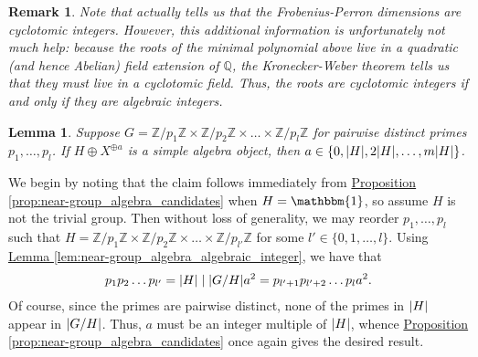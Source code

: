 \documentclass[12pt, reqno]{amsart}
\numberwithin{equation}{section}
\theoremstyle{plainspace}
\newtheorem{lemma}[theorem]{Lemma}
\theoremstyle{definitionspace}
\theoremstyle{remarkspace}
\newtheorem{remark}[theorem]{Remark}
\renewenvironment{proof}{{\noindent\textbf{Proof.}}}{\null\hfill\qedsymbol}
\DeclarePairedDelimiter{\abs}{\lvert}{\rvert}
\begin{document}
\begin{remark}\label{rem:near-group_cyclotomic_integer}
Note that \cite[Corollary 8.54]{Etingof_2005} actually tells us that the Frobenius-Perron dimensions are cyclotomic integers. However, this additional information is unfortunately not much help: because the roots of the minimal polynomial above live in a quadratic (and hence Abelian) field extension of $\mathbb{Q}$, the Kronecker-Weber theorem tells us that they must live in a cyclotomic field. Thus, the roots are cyclotomic integers if and only if they are algebraic integers.
\end{remark}
\leavevmode

\begin{lemma}\label{lem:near-group_algebras_distinct_primes_general}
Suppose $G = \mathbb{Z}/p_1\mathbb{Z} \times \mathbb{Z}/p_2\mathbb{Z} \times \dots \times \mathbb{Z}/p_l\mathbb{Z}$ for pairwise distinct primes $p_1, \dots, p_l$. If $H \oplus X^{\oplus a}$ is a simple algebra object, then $a \in \{0, \abs{H}, 2\abs{H}, \dots, m\abs{H}\}$.
\end{lemma}
\leavevmode\newline
\begin{proof}
\noindent We begin by noting that the claim follows immediately from \hyperref[prop:near-group_algebra_candidates]{Proposition \ref*{prop:near-group_algebra_candidates}} when $H = \mathbbm{1}$, so assume $H$ is not the trivial group. Then without loss of generality, we may reorder $p_1, \dots, p_l$ such that $H = \mathbb{Z}/p_1\mathbb{Z} \times \mathbb{Z}/p_2\mathbb{Z} \times \dots \times \mathbb{Z}/p_{l'}\mathbb{Z}$ for some $l' \in \{0, 1, \dots, l\}$. Using \hyperref[lem:near-group_algebra_algebraic_integer]{Lemma \ref*{lem:near-group_algebra_algebraic_integer}}, we have that
\begin{align*}
\begin{split}
p_1 p_2 \dots p_{l'} = \abs{H} \mid \abs{G/H}a^2 = p_{l'+1} p_{l'+2} \dots p_l a^2.
\end{split}
\end{align*}
\noindent Of course, since the primes are pairwise distinct, none of the primes in $\abs{H}$ appear in $\abs{G/H}$. Thus, $a$ must be an integer multiple of $\abs{H}$, whence \hyperref[prop:near-group_algebra_candidates]{Proposition \ref*{prop:near-group_algebra_candidates}} once again gives the desired result.
\end{proof}
\newline
\end{document}
